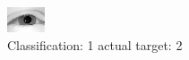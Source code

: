 \begin{figure}[h!]
\begin{center}
\includegraphics[width=0.60\columnwidth]{figures/ID2326_class_1_target_2.png}
\end{center}
\caption{ Classification: 1 actual target: 2}
\label{fig:ID2326_class_1_target_2}
\end{figure}
